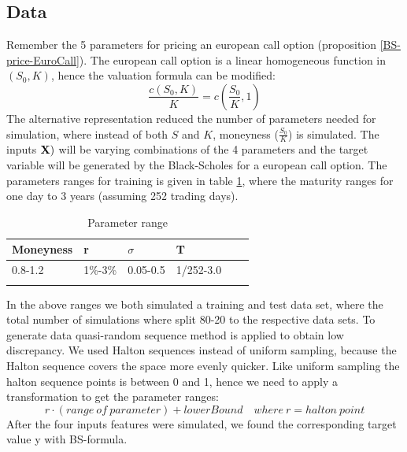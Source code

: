 \subsection{Data}
Remember the 5 parameters for pricing an european call option (proposition \ref{BS-price-EuroCall}).  The european call option is a linear homogeneous function in $(S_0,K)$, hence the valuation formula can be modified:
$$\frac{c(S_0,K)}{K}=c(\frac{S_0}{K},1)$$
The alternative representation reduced the number of parameters needed for simulation, where instead of both $S$ and $K$, moneyness ($\frac{S_0}{K}$) is simulated. The inputs $\mathbf{X})$ will be varying combinations of the 4 parameters and the target variable will be generated by the Black-Scholes for a european call option. The parameters ranges for training is given in table \ref{tab:euroParRange}, where the maturity ranges for one day to 3 years (assuming 252 trading days). 

\begin{table}[th]
\caption{Parameter range}
\label{tab:euroParRange}
\centering
\begin{tabular}{l l l l l l }
\toprule
\textbf{Moneyness} & \textbf{r} & \textbf{$\sigma$} & \textbf{T} \\
\midrule
0.8-1.2 & 1\%-3\% & 0.05-0.5 & 1/252-3.0\\ 
\bottomrule\\
\end{tabular}
\end{table}

In the above ranges we both simulated a training and test data set, where the total number of simulations where split 80-20 to the respective data sets. To generate data quasi-random sequence method is applied to obtain low discrepancy. We used Halton sequences instead of uniform sampling, because the Halton sequence covers the space more evenly quicker. Like uniform sampling the halton sequence points is between 0 and 1, hence we need to apply a transformation to get the parameter ranges:
$$r \cdot (range \ of \ parameter) + lowerBound \quad where \ r=halton \ point$$
After the four inputs features were simulated, we found the corresponding target value y with BS-formula. 

